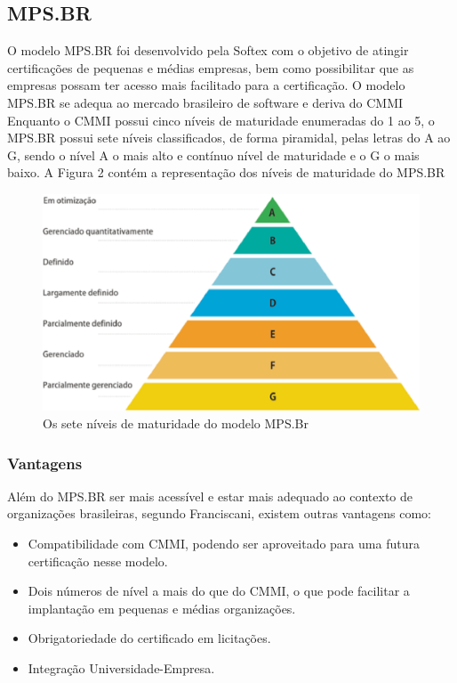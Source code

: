   \subsection{MPS.BR}

    O modelo MPS.BR foi desenvolvido pela Softex com o objetivo de atingir
    certificações de pequenas e médias empresas, bem como possibilitar que
    as empresas possam ter acesso mais facilitado para a certificação.
    O modelo MPS.BR se adequa ao mercado brasileiro de software e deriva do CMMI
    Enquanto o CMMI possui cinco níveis de maturidade enumeradas do 1 ao 5, o
    MPS.BR possui sete níveis classificados, de forma piramidal,  pelas letras
    do A ao G, sendo o nível A o mais alto e contínuo nível de maturidade e o G
    o mais baixo. A Figura 2 contém a representação dos níveis de maturidade do
    MPS.BR

    \begin{figure}[!ht]
      \centering
      \includegraphics[width=15cm, keepaspectratio=true]{figuras/maturidade/niveis-mpsbr.eps}
      \caption{Os sete níveis de maturidade do modelo MPS.Br}
    \end{figure}

  \subsubsection{Vantagens}

    Além do MPS.BR ser mais acessível e estar mais adequado ao contexto de
    organizações brasileiras, segundo Franciscani, existem outras vantagens
    como:

    \begin{itemize}
      \item{Compatibilidade com CMMI, podendo ser aproveitado para uma futura
            certificação nesse modelo.}
      \item{Dois números de nível a mais do que do CMMI, o que pode facilitar a
            implantação em pequenas e médias organizações.}
      \item{Obrigatoriedade do certificado em licitações.}
      \item{Integração Universidade-Empresa.}
    \end{itemize}

